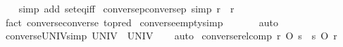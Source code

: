 \begin{isabellebody}
%
\isadelimproof
\ \ %
\endisadelimproof
%
\isatagproof
{}\isamarkupfalse%
\ {\isacharparenleft}{\kern0pt}simp\ add{\isacharcolon}{\kern0pt}\ set{\isacharunderscore}{\kern0pt}eq{\isacharunderscore}{\kern0pt}iff{\isacharparenright}{\kern0pt}%
\endisatagproof
{\isafoldproof}%
%
\isadelimproof
\isanewline
%
\endisadelimproof
\isanewline
{}\isamarkupfalse%
\ conversep{\isacharunderscore}{\kern0pt}conversep\ {\isacharbrackleft}{\kern0pt}simp{\isacharbrackright}{\kern0pt}{\isacharcolon}{\kern0pt}\ {\isachardoublequoteopen}{\isacharparenleft}{\kern0pt}r{\isasyminverse}{\isasyminverse}{\isacharparenright}{\kern0pt}{\isasyminverse}{\isasyminverse}\ {\isacharequal}{\kern0pt}\ r{\isachardoublequoteclose}\isanewline
%
\isadelimproof
\ \ %
\endisadelimproof
%
\isatagproof
{}\isamarkupfalse%
\ {\isacharparenleft}{\kern0pt}fact\ converse{\isacharunderscore}{\kern0pt}converse\ {\isacharbrackleft}{\kern0pt}to{\isacharunderscore}{\kern0pt}pred{\isacharbrackright}{\kern0pt}{\isacharparenright}{\kern0pt}%
\endisatagproof
{\isafoldproof}%
%
\isadelimproof
\isanewline
%
\endisadelimproof
\isanewline
{}\isamarkupfalse%
\ converse{\isacharunderscore}{\kern0pt}empty{\isacharbrackleft}{\kern0pt}simp{\isacharbrackright}{\kern0pt}{\isacharcolon}{\kern0pt}\ {\isachardoublequoteopen}{\isacharbraceleft}{\kern0pt}{\isacharbraceright}{\kern0pt}{\isasyminverse}\ {\isacharequal}{\kern0pt}\ {\isacharbraceleft}{\kern0pt}{\isacharbraceright}{\kern0pt}{\isachardoublequoteclose}\isanewline
%
\isadelimproof
\ \ %
\endisadelimproof
%
\isatagproof
{}\isamarkupfalse%
\ auto%
\endisatagproof
{\isafoldproof}%
%
\isadelimproof
\isanewline
%
\endisadelimproof
\isanewline
{}\isamarkupfalse%
\ converse{\isacharunderscore}{\kern0pt}UNIV{\isacharbrackleft}{\kern0pt}simp{\isacharbrackright}{\kern0pt}{\isacharcolon}{\kern0pt}\ {\isachardoublequoteopen}UNIV{\isasyminverse}\ {\isacharequal}{\kern0pt}\ UNIV{\isachardoublequoteclose}\isanewline
%
\isadelimproof
\ \ %
\endisadelimproof
%
\isatagproof
{}\isamarkupfalse%
\ auto%
\endisatagproof
{\isafoldproof}%
%
\isadelimproof
\isanewline
%
\endisadelimproof
\isanewline
{}\isamarkupfalse%
\ converse{\isacharunderscore}{\kern0pt}relcomp{\isacharcolon}{\kern0pt}\ {\isachardoublequoteopen}{\isacharparenleft}{\kern0pt}r\ O\ s{\isacharparenright}{\kern0pt}{\isasyminverse}\ {\isacharequal}{\kern0pt}\ s{\isasyminverse}\ O\ r{\isasyminverse}{\isachardoublequoteclose}\isanewline
%
\isadelimproof
\ \ %
\endisadelimproof
%
\isatagproof
{}\isamarkupfalse%

\end{isabellebody}
